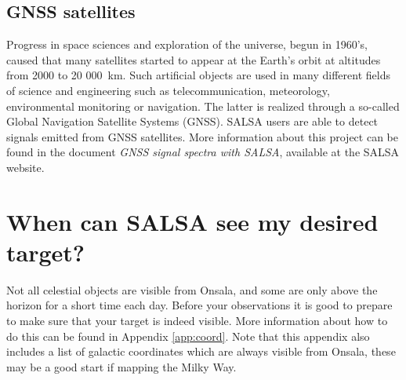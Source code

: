 \subsection{GNSS satellites}

Progress in space sciences and exploration of the universe, begun in 1960's, caused that
many satellites started to appear at the Earth's orbit at altitudes from 2000 to 20 000~km. 
Such artificial objects are used in many different fields of science and engineering such as 
telecommunication, meteorology, environmental monitoring or navigation. The latter is realized through 
a so-called Global Navigation Satellite Systems (GNSS). SALSA users are able to detect signals emitted from 
GNSS satellites. More information about this project can be found in the document 
\emph{GNSS signal spectra with SALSA}, available at the SALSA website.

%

\section{When can SALSA see my desired target?}
Not all celestial objects are visible from Onsala, and some are only above the
horizon for a short time each day. Before your observations it is good to
prepare to make sure that your target is indeed visible. More information about
how to do this can be found in Appendix \ref{app:coord}. Note that this
appendix also includes a list of galactic coordinates which are always visible
from Onsala, these may be a good start if mapping the Milky Way. 

